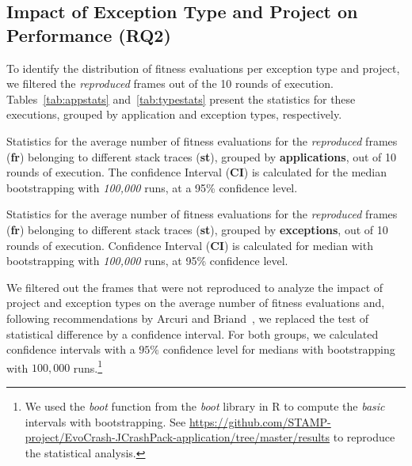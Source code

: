 \subsection{Impact of Exception Type and Project on Performance (RQ2)}

To identify the distribution of fitness evaluations per exception type and project, we filtered the \emph{reproduced} frames out of the 10 rounds of execution.
Tables~\ref{tab:appstats} and~\ref{tab:typestats} present the statistics for these executions, grouped by application and exception types, respectively.

\begin{table}[t]
\caption{Statistics for the average number of fitness evaluations for the \textit{reproduced} frames (\textbf{fr}) belonging to different stack traces (\textbf{st}), grouped by \textbf{applications}, out of 10 rounds of execution.
The confidence Interval (\textbf{CI}) is calculated for the median bootstrapping with \textit{100,000} runs, at a 95\% confidence level.}
\label{tab:appstats}
\begin{scriptsize}

\end{scriptsize}
\end{table}

\begin{table}[t]
\caption{Statistics for the average number of fitness evaluations for the \textit{reproduced} frames (\textbf{fr}) belonging to different stack traces (\textbf{st}), grouped by \textbf{exceptions}, out of 10 rounds of execution.
Confidence Interval (\textbf{CI}) is calculated for median with bootstrapping with \textit{100,000} runs, at 95\% confidence level.}
\label{tab:typestats}
\begin{scriptsize}

\end{scriptsize}
\end{table}

We filtered out the frames that were not reproduced to analyze the impact of project and exception types on the average number of fitness evaluations and, following recommendations by Arcuri and Briand~\cite{Arcuri2014}, we replaced the test of statistical difference by a confidence interval.
For both groups, we calculated confidence intervals with a  $95\%$ confidence level for medians with bootstrapping with $100,000$ runs.\footnote{We used the \textit{boot} function from the \textit{boot} library in R to compute the \textit{basic} intervals with bootstrapping. See \url{https://github.com/STAMP-project/EvoCrash-JCrashPack-application/tree/master/results} to reproduce the statistical analysis.}

